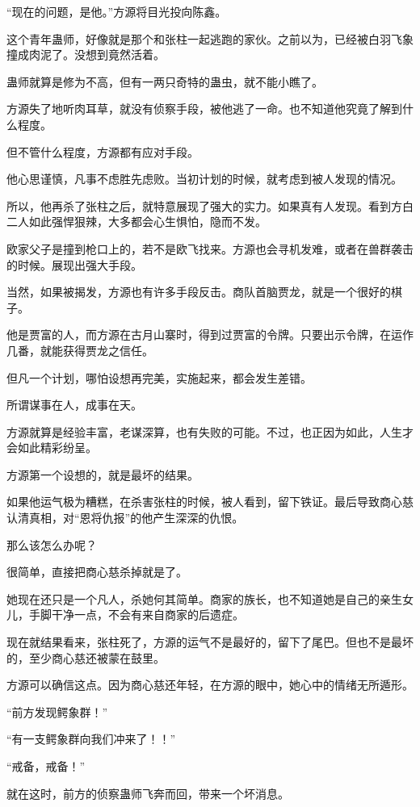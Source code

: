 \begin{this_body}
“现在的问题，是他。”方源将目光投向陈鑫。

这个青年蛊师，好像就是那个和张柱一起逃跑的家伙。之前以为，已经被白羽飞象撞成肉泥了。没想到竟然活着。

蛊师就算是修为不高，但有一两只奇特的蛊虫，就不能小瞧了。

方源失了地听肉耳草，就没有侦察手段，被他逃了一命。也不知道他究竟了解到什么程度。

但不管什么程度，方源都有应对手段。

他心思谨慎，凡事不虑胜先虑败。当初计划的时候，就考虑到被人发现的情况。

所以，他再杀了张柱之后，就特意展现了强大的实力。如果真有人发现。看到方白二人如此强悍狠辣，大多都会心生惧怕，隐而不发。

欧家父子是撞到枪口上的，若不是欧飞找来。方源也会寻机发难，或者在兽群袭击的时候。展现出强大手段。

当然，如果被揭发，方源也有许多手段反击。商队首脑贾龙，就是一个很好的棋子。

他是贾富的人，而方源在古月山寨时，得到过贾富的令牌。只要出示令牌，在运作几番，就能获得贾龙之信任。

但凡一个计划，哪怕设想再完美，实施起来，都会发生差错。

所谓谋事在人，成事在天。

方源就算是经验丰富，老谋深算，也有失败的可能。不过，也正因为如此，人生才会如此精彩纷呈。

方源第一个设想的，就是最坏的结果。

如果他运气极为糟糕，在杀害张柱的时候，被人看到，留下铁证。最后导致商心慈认清真相，对“恩将仇报”的他产生深深的仇恨。

那么该怎么办呢？

很简单，直接把商心慈杀掉就是了。

她现在还只是一个凡人，杀她何其简单。商家的族长，也不知道她是自己的亲生女儿，手脚干净一点，不会有来自商家的后遗症。

现在就结果看来，张柱死了，方源的运气不是最好的，留下了尾巴。但也不是最坏的，至少商心慈还被蒙在鼓里。

方源可以确信这点。因为商心慈还年轻，在方源的眼中，她心中的情绪无所遁形。

“前方发现鳄象群！”

“有一支鳄象群向我们冲来了！！”

“戒备，戒备！”

就在这时，前方的侦察蛊师飞奔而回，带来一个坏消息。


\end{this_body}
